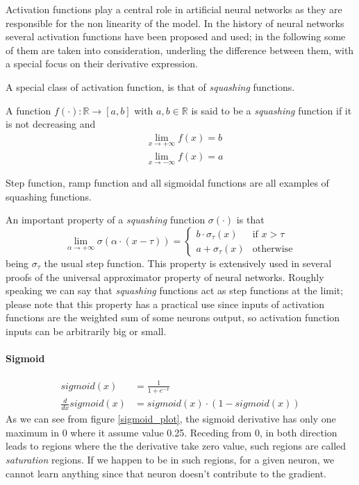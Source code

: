 Activation functions play a central role in artificial neural networks as they are responsible for the non linearity of the model.
In the history of neural networks several activation functions have been proposed and used; in the following some of them are taken into consideration,
underling the difference between them, with a special focus on their derivative expression.

A special class of activation function, is that of \textit{squashing} functions.

\begin{defn}
A function $f(\cdot):\mathbb{R}\rightarrow[a,b]$ with $a,b \in \mathbb{R}$ is said to be a \textit{squashing} function if it is not decreasing and 
\begin{align}
&\lim_{x \to +\infty} f(x) = b \\
&\lim_{x \to -\infty} f(x) = a 
\end{align}
\end{defn}
Step function, ramp function and all sigmoidal functions are all examples of squashing functions.

\begin{remark}
An important property of a \textit{squashing} function $\sigma(\cdot)$ is that
\begin{equation}
 \lim_{\alpha \to +\infty} \sigma(\alpha\cdot (x-\tau))= 
 \begin{cases}
    b \cdot \sigma_{\tau}(x) & \text{if $x> \tau $}\\
    a + \sigma_{\tau}(x) & \text{otherwise}
  \end{cases}
\end{equation}
being $\sigma_{\tau}$ the usual step function.
This property is extensively used in several proofs of the universal approximator property of neural networks. Roughly speaking we can say that \textit{squashing} functions act as step functions
at the limit; please note that this property has a practical use since inputs of activation functions are the weighted sum of some neurons output,
so activation function inputs can be arbitrarily big or small.
\end{remark}


\paragraph{Sigmoid}

\begin{align}
sigmoid(x)&= \frac{1}{1+e^{-x}}  \\ 
\frac{d}{dx}sigmoid(x)&= sigmoid(x) \cdot (1-sigmoid(x))
\end{align}
As we can see from figure \ref{sigmoid_plot}, the sigmoid derivative has only one maximum in 0 where it assume value 0.25. Receding from 0, in both direction leads to regions where
the the derivative take zero value, such regions are called \textit{saturation} regions. If we happen to be in such regions, for a given neuron, we cannot learn anything since that neuron doesn't contribute
to the gradient.

